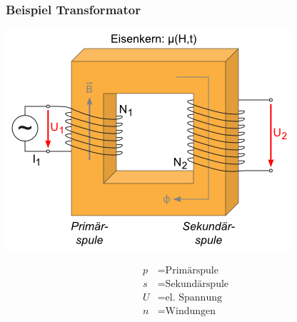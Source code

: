     \subsubsection{Beispiel Transformator}
        \begin{minipage}{0.49\linewidth}
            \includegraphics[width = \linewidth]{src/images/transformator.png}
        \end{minipage}
        \begin{minipage}{0.49\linewidth}
            \begin{scriptsize}
                \begin{align*}
                    p &= \text{Primärspule}\\
                    s &= \text{Sekundärspule}\\
                    U &= \text{el. Spannung}\\
                    n &= \text{Windungen}
                \end{align*}
            \end{scriptsize}
        \end{minipage}

    